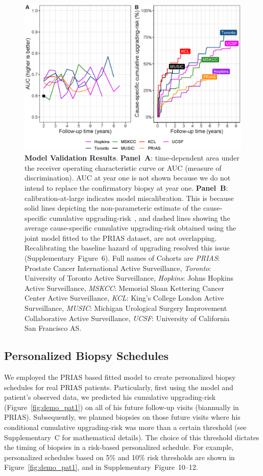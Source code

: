 \begin{figure}
\centerline{\includegraphics[width=\columnwidth]{images/auc_beforecalib.eps}}
\caption{\textbf{Model Validation Results}. \textbf{Panel~A}: time-dependent area under the receiver operating characteristic curve or AUC (measure of discrimination). AUC at year one is not shown because we do not intend to replace the confirmatory biopsy at year one. \textbf{Panel~B}: calibration-at-large indicates model miscalibration. This is because solid lines depicting the non-parameteric estimate of the cause-specific cumulative upgrading-risk~\citep{turnbull1976empirical}, and dashed lines showing the average cause-specific cumulative upgrading-risk obtained using the joint model fitted to the PRIAS dataset, are not overlapping. Recalibrating the baseline hazard of upgrading resolved this issue (Supplementary~Figure~6). Full names of Cohorts are \textit{PRIAS}: Prostate Cancer International Active Surveillance, \textit{Toronto}: University of Toronto Active Surveillance, \textit{Hopkins}: Johns Hopkins Active Surveillance, \textit{MSKCC}: Memorial Sloan Kettering Cancer Center Active Surveillance, \textit{KCL}: King's College London Active Surveillance, \textit{MUSIC}: Michigan Urological Surgery Improvement Collaborative Active Surveillance, \textit{UCSF}: University of California San Francisco AS.}
\label{fig:auc_beforecalib}
\end{figure}

\subsection{Personalized Biopsy Schedules}
We employed the PRIAS based fitted model to create personalized biopsy schedules for real PRIAS patients. Particularly, first using the model and patient's observed data, we predicted his cumulative upgrading-risk (Figure~\ref{fig:demo_pat1}) on all of his future follow-up visits (biannually in PRIAS). Subsequently, we planned biopsies on those future visits where his conditional cumulative upgrading-risk was more than a certain threshold (see Supplementary~C for mathematical details). The choice of this threshold dictates the timing of biopsies in a risk-based personalized schedule. For example, personalized schedules based on 5\% and 10\% risk thresholds are shown in Figure~\ref{fig:demo_pat1}, and in Supplementary~Figure~10--12. 

